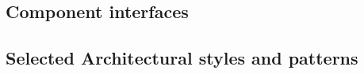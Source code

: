 \subsection{Component interfaces}




\subsection{Selected Architectural styles and patterns}
 \label{cleanArchiref}
